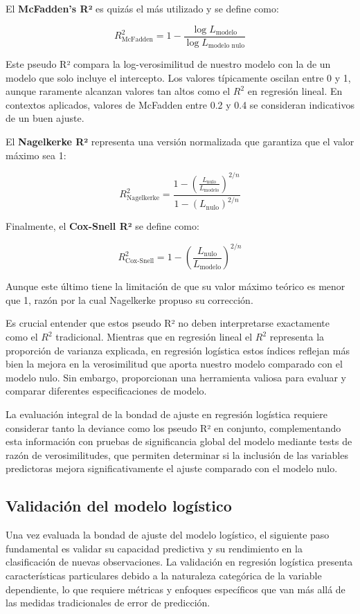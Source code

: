 \documentclass[
  letterpaper,
  DIV=11,
  numbers=noendperiod]{scrreprt}
\begin{document}
El \textbf{McFadden's R²} es quizás el más utilizado y se define como:

\[R^2_{\text{McFadden}} = 1 - \frac{\log L_{\text{modelo}}}{\log L_{\text{modelo nulo}}}\]

Este pseudo R² compara la log-verosimilitud de nuestro modelo con la de
un modelo que solo incluye el intercepto. Los valores típicamente
oscilan entre 0 y 1, aunque raramente alcanzan valores tan altos como el
\(R^2\) en regresión lineal. En contextos aplicados, valores de McFadden
entre 0.2 y 0.4 se consideran indicativos de un buen ajuste.

El \textbf{Nagelkerke R²} representa una versión normalizada que
garantiza que el valor máximo sea 1:

\[R^2_{\text{Nagelkerke}} = \frac{1 - \left(\frac{L_{\text{nulo}}}{L_{\text{modelo}}}\right)^{2/n}}{1 - (L_{\text{nulo}})^{2/n}}\]

Finalmente, el \textbf{Cox-Snell R²} se define como:

\[R^2_{\text{Cox-Snell}} = 1 - \left(\frac{L_{\text{nulo}}}{L_{\text{modelo}}}\right)^{2/n}\]

Aunque este último tiene la limitación de que su valor máximo teórico es
menor que 1, razón por la cual Nagelkerke propuso su corrección.

Es crucial entender que estos pseudo R² no deben interpretarse
exactamente como el \(R^2\) tradicional. Mientras que en regresión
lineal el \(R^2\) representa la proporción de varianza explicada, en
regresión logística estos índices reflejan más bien la mejora en la
verosimilitud que aporta nuestro modelo comparado con el modelo nulo.
Sin embargo, proporcionan una herramienta valiosa para evaluar y
comparar diferentes especificaciones de modelo.

La evaluación integral de la bondad de ajuste en regresión logística
requiere considerar tanto la deviance como los pseudo R² en conjunto,
complementando esta información con pruebas de significancia global del
modelo mediante tests de razón de verosimilitudes, que permiten
determinar si la inclusión de las variables predictoras mejora
significativamente el ajuste comparado con el modelo nulo.

\subsection{Validación del modelo
logístico}\label{validaciuxf3n-del-modelo-loguxedstico}

Una vez evaluada la bondad de ajuste del modelo logístico, el siguiente
paso fundamental es validar su capacidad predictiva y su rendimiento en
la clasificación de nuevas observaciones. La validación en regresión
logística presenta características particulares debido a la naturaleza
categórica de la variable dependiente, lo que requiere métricas y
enfoques específicos que van más allá de las medidas tradicionales de
error de predicción.
\end{document}
